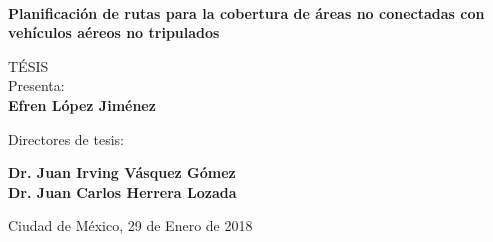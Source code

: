 \documentclass[letter]{letter}
\begin{document}
	\begin{minipage}[c][0.8\textheight][c]{0.2\textwidth}
		\begin{center}
			\hskip2pt
			\vrule width2.5pt height17cm 
			\hskip1mm
			\vrule width1pt height17cm \\     	
			\end{center}
	\end{minipage}
	\begin{minipage}[c][0.6\textheight][c]{0.65\textwidth}
	\begin{center}
	
	{\Large \textbf{Planificaci\'on de rutas para la cobertura de  \'areas no conectadas con vehículos a\'ereos no tripulados}}
	\vspace{1cm}
	
	{\large {TÉSIS}}\\[40pt]            
	Presenta:\\[5pt]
	\textbf{{Efren L\'opez Jim\'enez}}
	
	\vspace{1cm}
	
	{\small Directores de tesis:}
	
	{\large \textbf{Dr. Juan Irving Vásquez Gómez
	\\Dr. Juan Carlos Herrera Lozada}}
	
	\vspace{2cm}
	
	{Ciudad de M\'exico,}{ }{29 de Enero de 2018}
	\end{center}
	\end{minipage}
\end{document}
